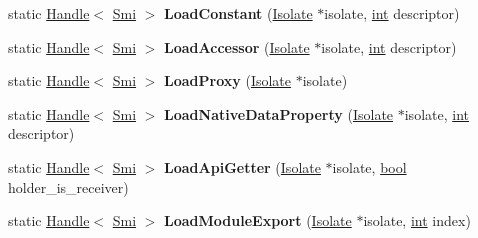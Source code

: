 \begin{DoxyCompactItemize}
static \mbox{\hyperlink{classv8_1_1internal_1_1Handle}{Handle}}$<$ \mbox{\hyperlink{classv8_1_1internal_1_1Smi}{Smi}} $>$ {\bfseries Load\+Constant} (\mbox{\hyperlink{classv8_1_1internal_1_1Isolate}{Isolate}} $\ast$isolate, \mbox{\hyperlink{classint}{int}} descriptor)
\item 
\mbox{\label{classv8_1_1internal_1_1LoadHandler_a7f95bf4c56319560a2bcd9a06c12e4fd}} 
static \mbox{\hyperlink{classv8_1_1internal_1_1Handle}{Handle}}$<$ \mbox{\hyperlink{classv8_1_1internal_1_1Smi}{Smi}} $>$ {\bfseries Load\+Accessor} (\mbox{\hyperlink{classv8_1_1internal_1_1Isolate}{Isolate}} $\ast$isolate, \mbox{\hyperlink{classint}{int}} descriptor)
\item 
\mbox{\label{classv8_1_1internal_1_1LoadHandler_a4cebd61635fd406afe6c8822c86f5318}} 
static \mbox{\hyperlink{classv8_1_1internal_1_1Handle}{Handle}}$<$ \mbox{\hyperlink{classv8_1_1internal_1_1Smi}{Smi}} $>$ {\bfseries Load\+Proxy} (\mbox{\hyperlink{classv8_1_1internal_1_1Isolate}{Isolate}} $\ast$isolate)
\item 
\mbox{\label{classv8_1_1internal_1_1LoadHandler_a0f6f6dc65ac79b844890fcbbbc769625}} 
static \mbox{\hyperlink{classv8_1_1internal_1_1Handle}{Handle}}$<$ \mbox{\hyperlink{classv8_1_1internal_1_1Smi}{Smi}} $>$ {\bfseries Load\+Native\+Data\+Property} (\mbox{\hyperlink{classv8_1_1internal_1_1Isolate}{Isolate}} $\ast$isolate, \mbox{\hyperlink{classint}{int}} descriptor)
\item 
\mbox{\label{classv8_1_1internal_1_1LoadHandler_a779e644b52dfa8fe080e2df1f4a94052}} 
static \mbox{\hyperlink{classv8_1_1internal_1_1Handle}{Handle}}$<$ \mbox{\hyperlink{classv8_1_1internal_1_1Smi}{Smi}} $>$ {\bfseries Load\+Api\+Getter} (\mbox{\hyperlink{classv8_1_1internal_1_1Isolate}{Isolate}} $\ast$isolate, \mbox{\hyperlink{classbool}{bool}} holder\+\_\+is\+\_\+receiver)
\item 
\mbox{\label{classv8_1_1internal_1_1LoadHandler_a8cb25930a6db6abf820c66d6967422b5}} 
static \mbox{\hyperlink{classv8_1_1internal_1_1Handle}{Handle}}$<$ \mbox{\hyperlink{classv8_1_1internal_1_1Smi}{Smi}} $>$ {\bfseries Load\+Module\+Export} (\mbox{\hyperlink{classv8_1_1internal_1_1Isolate}{Isolate}} $\ast$isolate, \mbox{\hyperlink{classint}{int}} index)

\end{DoxyCompactItemize}
